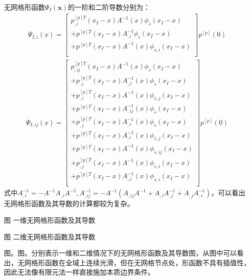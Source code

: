 \documentclass[a4paper]{ctexbook}
\begin{document}
无网格形函数$\Psi_I(\pmb{x})$的一阶和二阶导数分别为：
\begin{equation}
\begin{split}
    \Psi_{I,i}(x)=\left[\begin{matrix}
    p_{,i}^{[p]T}(x_I-x)A^{-1}(x)\phi_s(x_I-x)\\
    +p^{[p]T}(x_I-x)A_{,i}^{-1}\phi_s(x_I-x)\\
    +p^{[p]T}(x_I-x)A^{-1}(x)\phi _{s,i}(x_I-x)\\
    \end{matrix}\right]
    p^{[p]}(0)
\end{split}
\end{equation}
\begin{equation}
\begin{split}
    \Psi_{I,ij}(x)=\left[\begin{matrix}
    p_{,ij}^{[p]T}(x_I-x)A^{-1}(x)\phi_s(x_I-x)\\
    +p_{,i}^{[p]T}(x_I-x)A_{,j}^{-1}(x)\phi_s(x_I-x)\\
    +p_{,i}^{[p]T}(x_I-x)A^{-1}(x)\phi_{s,j}(x_I-x)\\
    +p^{[p]T}(x_I-x)A_{,ij}^{-1}(x)\phi_s(x_I-x)\\
    +p_{,j}^{[p]T}(x_I-x)A_{,i}^{-1}(x)\phi_s(x_I-x)\\
    +p^{[p]T}(x_I-x)A_{,i}^{-1}(x)\phi_{s,j}(x_I-x)\\
    +p^{[p]T}(x_I-x)A^{-1}(x)\phi_{s,ij}(x_I-x)\\
    +p_{,j}^{[p]T}(x_I-x)A^{-1}(x)\phi_{s,i}(x_I-x)\\
    +p^{[p]T}(x_I-x)A_{,j}^{-1}(x)\phi_{s,i}(x_I-x)\\
    \end{matrix}\right]
    p^{[p]}(0)
\end{split}
\end{equation}
式中$A_{,i}^{-1}=-A^{-1}A_{,i}A^{-1},A_{,ij}^{-1}=-A^{-1}(A_{,ij}A^{-1}+A_{,i}A_{,j}^{-1}+A_{,j}A_{,i}^{-1})$，可以看出无网格形函数及其导数的计算都较为复杂。\par
图 一维无网格形函数及其导数\\\par
图 二维无网格形函数及其导数\par
图。图。分别表示一维和二维情况下的无网格形函数及其导数图，从图中可以看出，无网格形函数在全域上连续光滑，但在无网格节点处，形函数不具有插值性，因此无法像有限元法一样直接施加本质边界条件。
\end{document}
